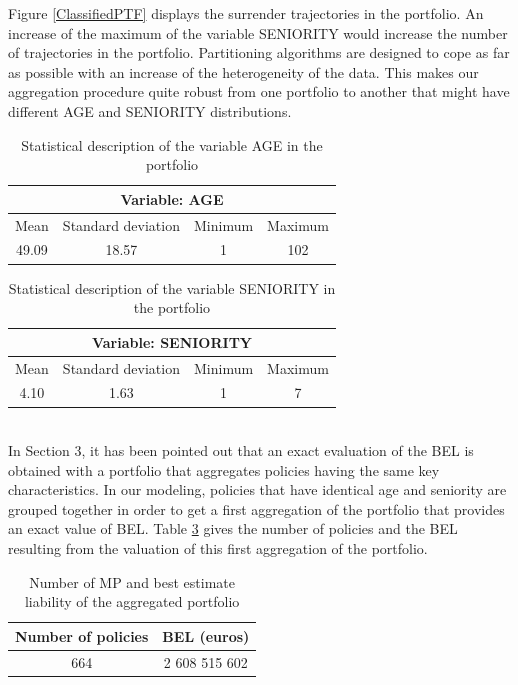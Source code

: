 Figure \ref{ClassifiedPTF} displays the surrender trajectories in the portfolio. An increase of the maximum of the variable SENIORITY would increase the number of trajectories in the portfolio. Partitioning algorithms are designed to cope as far as possible with an increase of the heterogeneity of the data. This makes our aggregation procedure quite robust from one portfolio to another that might have different AGE and SENIORITY distributions. 
\begin{table}[ht!]
\centering
\begin{tabular}{|c|c|c|c|}
\hline
\multicolumn{4}{|c|}{Variable: AGE}\\
\hline\hline
Mean&Standard deviation&Minimum&Maximum \\
\hline
49.09&18.57&1&102\\
\hline
\end{tabular}
\caption{Statistical description of the variable AGE in the portfolio}
\label{Age}
\end{table}
\begin{table}[ht]
\centering
\begin{tabular}{|c|c|c|c|}
\hline
\multicolumn{4}{|c|}{Variable: SENIORITY}\\
\hline\hline
Mean&Standard deviation&Minimum&Maximum \\
\hline
4.10&1.63&1&7\\
\hline
\end{tabular}
\caption{Statistical description of the variable SENIORITY in the portfolio}
\label{Seniority}
\end{table}\\
In Section 3, it has been pointed out that an exact evaluation of the BEL is obtained with a portfolio that aggregates policies having the same key characteristics. In our modeling, policies that have identical age and seniority are grouped together in order to get a first aggregation of the portfolio that provides an exact value of BEL. Table \ref{ExactBEL} gives the number of policies and the BEL resulting from the valuation of this first aggregation of the portfolio.
\begin{table}[ht!]
\centering
\begin{tabular}{|c|c|}
\hline
 Number of policies&BEL (euros)\\
\hline\hline
664&2 608 515 602\\
\hline
\end{tabular}
\caption{Number of MP and best estimate liability of the aggregated portfolio}
\label{ExactBEL}
\end{table}
